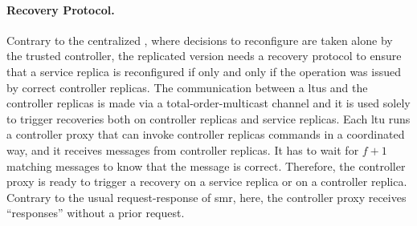\paragraph{Recovery Protocol.}
Contrary to the centralized \system, where decisions to reconfigure are taken alone by the trusted controller, the replicated version needs a recovery protocol to ensure that a service replica is reconfigured if only and only if the operation was issued by correct controller replicas.
The communication between a \glspl{ltu} and the controller replicas is made via a total-order-multicast channel and it is used solely to trigger recoveries both on controller replicas and service replicas.
Each \gls{ltu} runs a controller proxy that can invoke controller replicas commands in a coordinated way, and it receives messages from controller replicas.
It has to wait for $f+1$ matching messages to know that the message is correct. 
Therefore, the controller proxy is ready to trigger a recovery on a service replica or on a controller replica.
Contrary to the usual request-response of \gls{smr}, here, the controller proxy receives ``responses'' without a prior request. 


